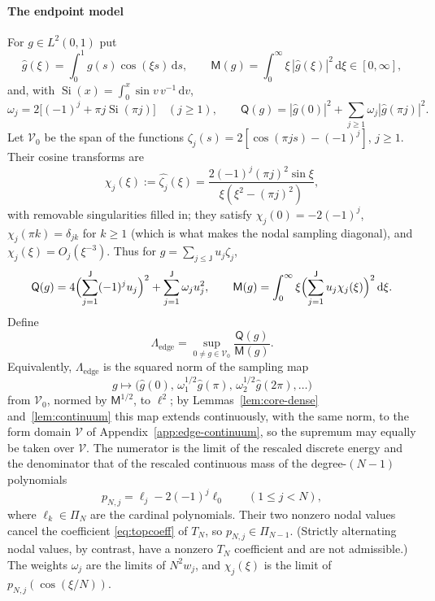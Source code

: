 \documentclass{siamart251216}
\newcommand{\Pn}{\Pi}
\newcommand{\dd}{\,\mathrm d}
\begin{document}
\paragraph{The endpoint model}
For $g\in L^2(0,1)$ put
\[
 \widehat g(\xi)=\int_0^1g(s)\cos(\xi s)\dd s,\qquad
 \mathsf M(g)=\int_0^\infty\xi\,|\widehat g(\xi)|^2\dd\xi\in[0,\infty],
\]
and, with $\operatorname{Si}(x)=\int_0^x\sin v\,v^{-1}\dd v$,
\[
 \omega_j=2\bigl[(-1)^j+\pi j\operatorname{Si}(\pi j)\bigr]\quad(j\ge1),\qquad
 \mathsf Q(g)=|\widehat g(0)|^2+\sum_{j\ge1}\omega_j|\widehat g(\pi j)|^2 .
\]
Let $\mathcal V_0$ be the span of the functions
$\zeta_j(s)=2[\cos(\pi js)-(-1)^j]$, $j\ge1$. Their cosine transforms are
\begin{equation}\label{eq:chi}
 \chi_j(\xi):=\widehat{\zeta_j}(\xi)
 =\frac{2(-1)^j(\pi j)^2\sin\xi}{\xi(\xi^2-(\pi j)^2)},
\end{equation}
with removable singularities filled in; they satisfy
$\chi_j(0)=-2(-1)^j$, $\chi_j(\pi k)=\delta_{jk}$ for $k\ge1$ (which is what
makes the nodal sampling diagonal), and
$\chi_j(\xi)=O_j(\xi^{-3})$. Thus for $g=\sum_{j\le\mathsf J}u_j\zeta_j$,
\[
 \mathsf Q(g)=4\Bigl(\sum_{j=1}^{\mathsf J}(-1)^ju_j\Bigr)^2+\sum_{j=1}^{\mathsf J}\omega_ju_j^2,
 \qquad
 \mathsf M(g)=\int_0^\infty\xi\Bigl(\sum_{j=1}^{\mathsf J}u_j\chi_j(\xi)\Bigr)^2\dd\xi .
\]
Define
\begin{equation}\label{eq:Lambda-edge}
 \Lambda_{\mathrm{edge}}
 =\sup_{0\ne g\in\mathcal V_0}\frac{\mathsf Q(g)}{\mathsf M(g)} .
\end{equation}
Equivalently, $\Lambda_{\mathrm{edge}}$ is the squared norm of the sampling
map
\[
 g\mapsto\bigl(\widehat g(0),\,\omega_1^{1/2}\widehat g(\pi),\,
 \omega_2^{1/2}\widehat g(2\pi),\dots\bigr)
\]
from $\mathcal V_0$, normed by $\mathsf M^{1/2}$, to $\ell^2$; by Lemmas~\ref{lem:core-dense}
and~\ref{lem:continuum} this map extends continuously, with the same norm,
to the form domain $\mathcal V$ of Appendix~\ref{app:edge-continuum}, so the
supremum may equally be taken over $\mathcal V$.
The numerator is the limit of the rescaled discrete energy and the denominator
that of the rescaled continuous mass of the degree-$(N-1)$ polynomials
\begin{equation}\label{eq:pNj}
 p_{N,j}=\ell_j-2(-1)^j\ell_0\qquad(1\le j<N),
\end{equation}
where $\ell_k\in\Pn_N$ are the cardinal polynomials. Their two nonzero
nodal values cancel the coefficient \eqref{eq:topcoeff} of $T_N$, so
$p_{N,j}\in\Pn_{N-1}$. (Strictly alternating nodal values, by contrast, have
a nonzero $T_N$ coefficient and are not admissible.) The weights $\omega_j$ are the limits
of $N^2w_j$, and $\chi_j(\xi)$ is the limit of $p_{N,j}(\cos(\xi/N))$.
\end{document}
